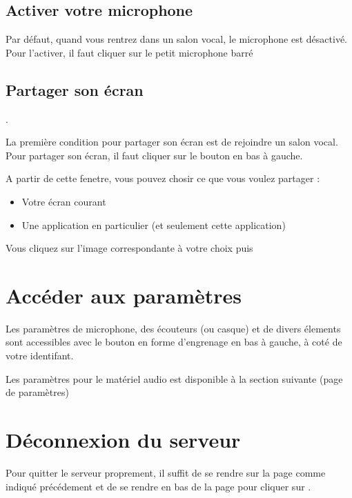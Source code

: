 \subsection{Activer votre microphone}

Par défaut, quand vous rentrez dans un salon vocal, le microphone est désactivé. Pour l'activer, il faut cliquer sur le petit microphone barré 




\subsection{Partager son écran}.

La première condition pour partager son écran est de rejoindre un salon vocal. \\

Pour partager son écran, il faut cliquer sur le bouton  en bas à gauche.


A partir de cette fenetre, vous pouvez chosir ce que vous voulez partager : 

	\begin{itemize}
		\item Votre écran courant
		\item Une application en particulier (et seulement cette application)
	\end{itemize}

	Vous cliquez sur l'image correspondante à votre choix puis 


\section{Accéder aux paramètres}

Les paramètres de microphone, des écouteurs (ou casque) et de divers élements sont accessibles avec le bouton en forme d'engrenage en bas à gauche, à coté de votre identifant.


Les paramètres pour le matériel audio est disponible à la section suivante (page de paramètres)



\section{Déconnexion du serveur}

Pour quitter le serveur proprement, il suffit de se rendre sur la page  comme indiqué précédement et de se rendre en bas de la page pour cliquer sur .

\newpage
{}
